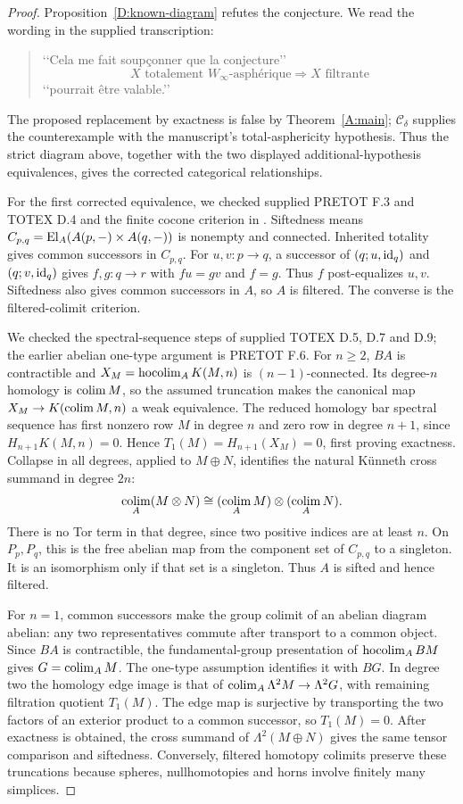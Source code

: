 \begin{proof}
Proposition~\ref{D:known-diagram} refutes the conjecture. We read
the wording in the supplied transcription:
\begin{quote}
\lq\lq Cela me fait soup\c{c}onner que la conjecture\rq\rq
\[
 X\text{ totalement }W_\infty\text{-asph\'erique}
 \Longrightarrow X\text{ filtrante}
\]
\lq\lq pourrait \^etre valable.\rq\rq
\end{quote}
The proposed replacement by exactness is false by
Theorem~\ref{A:main}; $\mathcal C_\delta$ supplies the counterexample
with the manuscript's total-asphericity hypothesis. Thus the strict
diagram above, together with the two displayed additional-hypothesis
equivalences, gives the corrected categorical relationships.

For the first corrected equivalence, we checked supplied PRETOT
F.3 and TOTEX D.4 and the finite cocone criterion in
\citet[Sections 15.2(c), 15.9]{GabrielUlmer1971}.
Siftedness means
$C_{p,q}=\operatorname{El}_A(A(p,-)\times A(q,-))$ is nonempty and connected.
Inherited totality gives common successors in $C_{p,q}$.
For $u,v:p\to q$, a successor of
$(q;u,\mathrm{id}_q)$ and $(q;v,\mathrm{id}_q)$ gives $f,g:q\to r$
with $fu=gv$ and $f=g$. Thus $f$ post-equalizes $u,v$.
Siftedness also gives common successors in $A$, so $A$ is
filtered. The converse is the filtered-colimit criterion.

We checked the spectral-sequence steps of supplied TOTEX D.5,
D.7 and D.9; the earlier abelian one-type argument is PRETOT F.6.
For $n\geq2$, $BA$ is contractible and
$X_M=\operatorname*{hocolim}_A K(M,n)$ is $(n-1)$-connected. Its degree-$n$
homology is $\operatorname*{colim} M$, so the assumed truncation makes the
canonical map $X_M\to K(\operatorname*{colim} M,n)$ a weak equivalence.
The reduced homology bar spectral sequence has first nonzero
row $M$ in degree $n$ and zero row in degree $n+1$, since
$H_{n+1}K(M,n)=0$. Hence $T_1(M)=H_{n+1}(X_M)=0$,
first proving exactness. Collapse in all degrees, applied to
$M\oplus N$, identifies the natural K\"unneth cross summand
in degree $2n$:
\[
 \operatorname*{colim}_A(M\otimes N)\cong(\operatorname*{colim}_A M)\otimes(\operatorname*{colim}_A N).
\]
There is no Tor term in that degree, since two positive indices
are at least $n$. On $P_p,P_q$, this is the free abelian map
from the component set of $C_{p,q}$ to a singleton. It is an
isomorphism only if that set is a singleton. Thus $A$ is sifted
and hence filtered.

For $n=1$, common successors make the group colimit of an
abelian diagram abelian: any two representatives commute after
transport to a common object. Since $BA$ is contractible, the
fundamental-group presentation of $\operatorname*{hocolim}_A BM$ gives
$G=\operatorname*{colim}_A M$. The one-type assumption identifies it with
$BG$. In degree two the homology edge image is that of
$\operatorname*{colim}_A\Lambda^2M\to\Lambda^2G$, with remaining filtration
quotient $T_1(M)$. The edge map is surjective by transporting
the two factors of an exterior product to a common successor,
so $T_1(M)=0$. After exactness is obtained, the cross summand
of $\Lambda^2(M\oplus N)$ gives the same tensor comparison
and siftedness. Conversely, filtered homotopy colimits preserve
these truncations because spheres, nullhomotopies and horns
involve finitely many simplices.


\end{proof}
